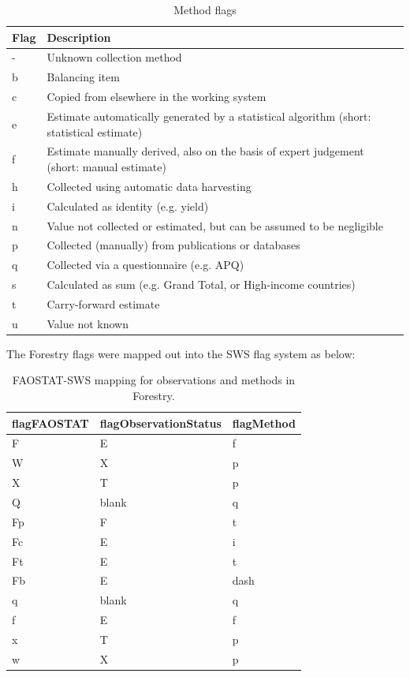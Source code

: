 \documentclass[
]{book}
\begin{document}
\begin{table}

\caption{\label{tab:tabFlagMethod}Method flags}
\centering
\fontsize{14}{16}\selectfont
\begin{tabular}[t]{l|l}
\hline
\rowcolor[HTML]{a9c9a7}  Flag & Description\\
\hline
- & Unknown collection method\\
\hline
b & Balancing item\\
\hline
c & Copied from elsewhere in the working system\\
\hline
e & Estimate automatically generated by a statistical algorithm (short: statistical estimate)\\
\hline
f & Estimate manually derived, also on the basis of expert judgement (short: manual estimate)\\
\hline
h & Collected using automatic data harvesting\\
\hline
i & Calculated as identity (e.g. yield)\\
\hline
n & Value not collected or estimated, but can be assumed to be negligible\\
\hline
p & Collected (manually) from publications or databases\\
\hline
q & Collected via a questionnaire (e.g. APQ)\\
\hline
s & Calculated as sum (e.g. Grand Total, or High-income countries)\\
\hline
t & Carry-forward estimate\\
\hline
u & Value not known\\
\hline
\end{tabular}
\end{table}

The Forestry flags were mapped out into the SWS flag system as below:

\begin{table}

\caption{\label{tab:flagMappedOut}FAOSTAT-SWS mapping for observations and methods in Forestry.}
\centering
\fontsize{12}{14}\selectfont
\begin{tabular}[t]{lll}
\toprule
\rowcolor[HTML]{a9c9a7}  flagFAOSTAT & flagObservationStatus & flagMethod\\
\midrule
F & E & f\\
W & X & p\\
X & T & p\\
Q & blank & q\\
Fp & F & t\\
\addlinespace
Fc & E & i\\
Ft & E & t\\
Fb & E & dash\\
q & blank & q\\
f & E & f\\
\addlinespace
x & T & p\\
w & X & p\\
\bottomrule
\end{tabular}
\end{table}
\end{document}
